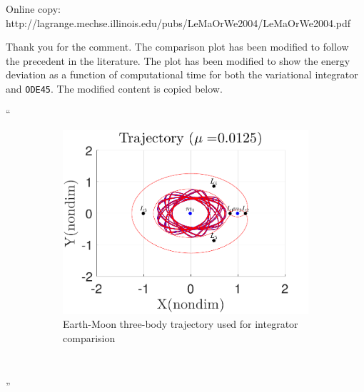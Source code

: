 \documentclass[11pt]{article}
\newenvironment{correction}{\begin{list}{}{\setlength{\leftmargin}{1cm}\setlength{\rightmargin}{1cm}}\vspace{\parsep}\item[]``}{''\end{list}}
\begin{document}
\begin{enumerate}
\begin{itshape}
Online copy:
http://lagrange.mechse.illinois.edu/pubs/LeMaOrWe2004/LeMaOrWe2004.pdf
\end{itshape}

Thank you for the comment.
The comparison plot has been modified to follow the precedent in the literature.
The plot has been modified to show the energy deviation as a function of computational time for both the variational integrator and \texttt{ODE45}.
The modified content is copied below.
\begin{correction}
\begin{figure} 
        \centering 
        \begin{subfigure}[h]{0.5\textwidth} 
                \includegraphics[width=\textwidth]{trajectory} 
                \caption{Earth-Moon three-body trajectory used for integrator comparision}
        \end{subfigure}~ %
        \begin{subfigure}[htbp]{0.5\textwidth} 

\end{subfigure}
\end{figure}
\end{correction}
\end{enumerate}
\end{document}
